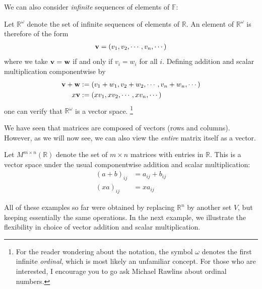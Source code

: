 \documentclass[12pt,letterpaper,reqno]{article}
\numberwithin{equation}{section}
\begin{document}
We can also consider \emph{infinite} sequences of elements of $\mathbb{F}$:

\begin{example}\label{ex:r_omega}
	Let $\mathbb{R}^\omega$ denote the set of infinite sequences of elements of $\mathbb{R}$. An element of $\mathbb{R}^\omega$ is therefore of the form 
	\begin{align*}{\bf v}=(v_1,v_2,\cdots, v_n,\cdots)
	\end{align*} 
	where we take ${\bf v}={\bf w}$ if and only if $v_i=w_i$ for all $i$. Defining addition and scalar multiplication componentwise by
	\begin{align*}
		{\bf v}+{\bf w} &:=(v_1+w_1,v_2+w_2,\cdots, v_n+w_n,\cdots) \\
	x{\bf v} &:=(xv_1, xv_2, \cdots, xv_n,\cdots)
	\end{align*}
	one can verify that $\mathbb{R}^\omega$ is a vector space. \footnote{For the reader wondering about the notation, the symbol $\omega$ denotes the first infinite \emph{ordinal}, which is most likely an unfamiliar concept. For those who are interested, I encourage you to go ask Michael Rawlins about ordinal numbers.}
\end{example}

We have seen that matrices are composed of vectors (rows and columns). However, as we will now see, we can also view the \emph{entire} matrix itself as a vector.

\begin{example}\label{ex:m_by_n}
	Let $M^{m \times n}(\mathbb{R})$ denote the set of $m \times n$ matrices with entries in $\mathbb{R}$. This is a vector space under the usual componentwise addition and scalar multiplication:
	\begin{align*}
		(a+b)_{ij}&=a_{ij}+b_{ij} \\
		(xa)_{ij}&=xa_{ij}
	\end{align*}
\end{example}

All of these examples so far were obtained by replacing $\mathbb{R}^n$ by another set $V$, but keeping essentially the same operations. In the next example, we illustrate the flexibility in choice of vector addition and scalar multiplication.
\end{document}
